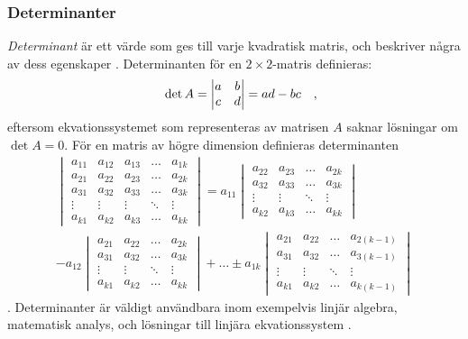 \subsubsection{Determinanter}
\emph{Determinant} är ett värde som ges till varje kvadratisk matris, och beskriver några av dess egenskaper \parencite{noauthor_determinant_nodate}. Determinanten för en \(2\times 2\)-matris definieras:
\begin{equation}
    \det A=
    \begin{vmatrix}
    a & b\\c & d
    \end{vmatrix}
    = ad-bc
\quad\mathrm{,}\!\!\!\!\!\!\end{equation} eftersom ekvationssystemet som representeras av matrisen \(A\) saknar lösningar om \(\det A=0\). För en matris av högre dimension definieras determinanten
\begin{equation}
    \begin{split}
    \begin{vmatrix}
        a_{11} & a_{12} & a_{13} & \hdots & a_{1k}\\
        a_{21} & a_{22} & a_{23} & \hdots & a_{2k}\\
        a_{31} & a_{32} & a_{33} & \hdots & a_{3k}\\
        \vdots & \vdots & \vdots & \ddots & \vdots\\
        a_{k1} & a_{k2} & a_{k3} & \hdots & a_{kk}
    \end{vmatrix}=
    a_{11}\begin{vmatrix}
        a_{22} & a_{23} & \hdots & a_{2k}\\
        a_{32} & a_{33} & \hdots & a_{3k}\\
        \vdots & \vdots & \ddots & \vdots\\
        a_{k2} & a_{k3} & \hdots & a_{kk}
    \end{vmatrix}\\-a_{12}\begin{vmatrix}
        a_{21} & a_{22} & \hdots & a_{2k}\\
        a_{31} & a_{32} & \hdots & a_{3k}\\
        \vdots & \vdots & \ddots & \vdots\\
        a_{k1} & a_{k2} & \hdots & a_{kk}
    \end{vmatrix}+\hdots\pm a_{1k}\begin{vmatrix}
        a_{21} & a_{22} & \hdots & a_{2(k-1)}\\
        a_{31} & a_{32} & \hdots & a_{3(k-1)}\\
        \vdots & \vdots & \ddots & \vdots\\
        a_{k1} & a_{k2} & \hdots & a_{k(k-1)}
    \end{vmatrix}
    \end{split}
\end{equation} \parencite{weisstein_determinant_nodate}. Determinanter är väldigt användbara inom exempelvis linjär algebra, matematisk analys, och lösningar till linjära ekvationssystem \parencites{weisstein_determinant_nodate}{noauthor_determinant_nodate}.

